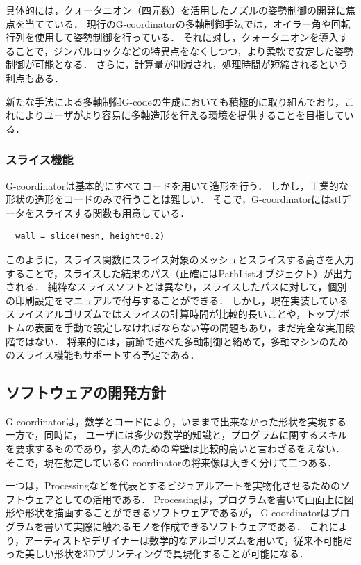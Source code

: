 \documentclass{article}
\begin{document}
\begin{twocolumn}
\begin{itemize}
具体的には，クォータニオン（四元数）を活用したノズルの姿勢制御の開発に焦点を当てている．
現行のG-coordinatorの多軸制御手法では，オイラー角や回転行列を使用して姿勢制御を行っている．
それに対し，クォータニオンを導入することで，ジンバルロックなどの特異点をなくしつつ，より柔軟で安定した姿勢制御が可能となる．\cite{yamaguchi1991}
さらに，計算量が削減され，処理時間が短縮されるという利点もある．

新たな手法による多軸制御G-codeの生成においても積極的に取り組んでおり，これによりユーザがより容易に多軸造形を行える環境を提供することを目指している．

\subsubsection{スライス機能}
G-coordinatorは基本的にすべてコードを用いて造形を行う．
しかし，工業的な形状の造形をコードのみで行うことは難しい．
そこで，G-coordinatorにはstlデータをスライスする関数も用意している．

\begin{lstlisting}
  wall = slice(mesh, height*0.2)
\end{lstlisting}
このように，スライス関数にスライス対象のメッシュとスライスする高さを入力することで，スライスした結果のパス（正確にはPathListオブジェクト）が出力される．
純粋なスライスソフトとは異なり，スライスしたパスに対して，個別の印刷設定をマニュアルで付与することができる．
しかし，現在実装しているスライスアルゴリズムではスライスの計算時間が比較的長いことや，トップ/ボトムの表面を手動で設定しなければならない等の問題もあり，まだ完全な実用段階ではない．
将来的には，前節で述べた多軸制御と絡めて，多軸マシンのためのスライス機能もサポートする予定である．

\subsection{ソフトウェアの開発方針}

G-coordinatorは，数学とコードにより，いままで出来なかった形状を実現する一方で，同時に，
ユーザには多少の数学的知識と，プログラムに関するスキルを要求するものであり，参入のための障壁は比較的高いと言わざるをえない．
そこで，現在想定しているG-coordinatorの将来像は大きく分けて二つある．

一つは，Processingなどを代表とするビジュアルアートを実物化させるためのソフトウェアとしての活用である．
Processingは，プログラムを書いて画面上に図形や形状を描画することができるソフトウェアであるが，
G-coordinatorはプログラムを書いて実際に触れるモノを作成できるソフトウェアである．
これにより，アーティストやデザイナーは数学的なアルゴリズムを用いて，従来不可能だった美しい形状を3Dプリンティングで具現化することが可能になる．


\end{itemize}
\end{twocolumn}
\end{document}
